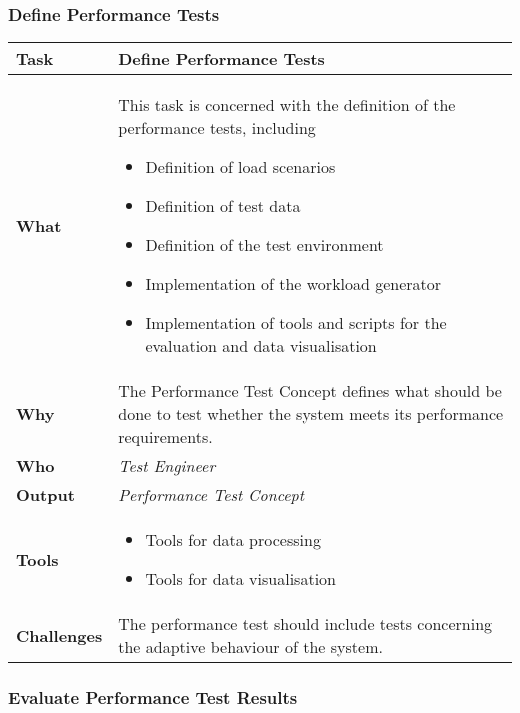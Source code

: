 \subsubsection{Define Performance Tests}
\begin{tabularx}{\textwidth}{@{} l X @{}}
	\caption{Define Performance Tests} \label{table:ch6_Task_Define_Performance_Tests}\\
	\toprule 
	\bfseries Task & Define Performance Tests\\
	\midrule 
	\bfseries What &
	This task is concerned with the definition of the performance tests, including
	\begin{itemize}
		\item Definition of load scenarios
		\item Definition of test data
		\item Definition of the test environment
		\item Implementation of the workload generator
		\item Implementation of tools and scripts for the evaluation and data visualisation
	\end{itemize}
	\\
	\midrule 
	\bfseries Why & The Performance Test Concept defines what should be done to test whether the system meets its performance requirements.\\
	\midrule 
	\bfseries Who & \emph{Test Engineer}\\
	\midrule 
	\bfseries Output & \emph{Performance Test Concept}\\
	\midrule
	\bfseries Tools & 
	\begin{itemize}
		\item Tools for data processing 
		\item Tools for data visualisation
	\end{itemize}\\
	\midrule
	\bfseries Challenges & The performance test should include tests concerning the adaptive behaviour of the system.\\
	\bottomrule 
\end{tabularx}

\subsubsection{Evaluate Performance Test Results}

